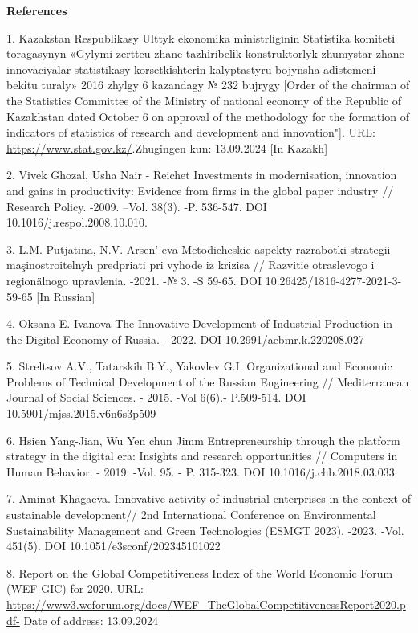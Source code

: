 {{{\bfseries References}

1. Kazakstan Respublikasy Ulttyk ekonomika ministrlіgіnіn Statistika
komitetі toragasynyn «Gylymi-zertteu zhane tazhіribelіk-konstruktorlyk
zhumystar zhane innovaciyalar statistikasy korsetkіshterіn kalyptastyru
bojynsha adіstemenі bekіtu turaly» 2016 zhylgy 6 kazandagy № 232 bujrygy
{[}Order of the chairman of the Statistics Committee of the Ministry of
national economy of the Republic of Kazakhstan dated October 6 on
approval of the methodology for the formation of indicators of
statistics of research and development and innovation"{]}. URL:
\url{https://www.stat.gov.kz/}.Zhugingen kun: 13.09.2024 {[}In Kazakh{]}

2. Vivek Ghozal, Usha Nair - Reichet Investments in modernisation,
innovation and gains in productivity: Evidence from firms in the global
paper industry // Research Policy. -2009. --Vol. 38(3). -P. 536-547. DOI
10.1016/j.respol.2008.10.010.

3. L.M. Putjatina, N.V. Arsen' eva Metodicheskie aspekty
razrabotki strategii maşinostroitelnyh predpriati pri vyhode iz krizisa
// Razvitie otraslevogo i regionälnogo upravlenia. -2021. -№ 3. -S
59-65. DOI 10.26425/1816-4277-2021-3-59-65 {[}In Russian{]}

4. Oksana E. Ivanova The Innovative Development of Industrial Production
in the Digital Economy of Russia. - 2022. DOI 10.2991/aebmr.k.220208.027

5. Streltsov A.V., Tatarskih B.Y., Yakovlev G.I. Organizational and
Economic Problems of Technical Development of the Russian Engineering //
Mediterranean Journal of Social Sciences. - 2015. -Vol 6(6).- P.509-514.
DOI 10.5901/mjss.2015.v6n6s3p509

6. Hsien Yang-Jian, Wu Yen chun Jimm Entrepreneurship through the
platform strategy in the digital era: Insights and research
opportunities // Computers in Human Behavior. - 2019. -Vol. 95. - P.
315-323. DOI 10.1016/j.chb.2018.03.033

7. Aminat Khagaeva. Innovative activity of industrial enterprises in the
context of sustainable development// 2nd International Conference on
Environmental Sustainability Management and Green Technologies (ESMGT
2023). -2023. -Vol. 451(5). DOI 10.1051/e3sconf/202345101022

8. Report on the Global Competitiveness Index of the World Economic
Forum (WEF GIC) for 2020. URL:
\url{https://www3.weforum.org/docs/WEF_TheGlobalCompetitivenessReport2020.pdf-}
Date of address: 13.09.2024

}}
